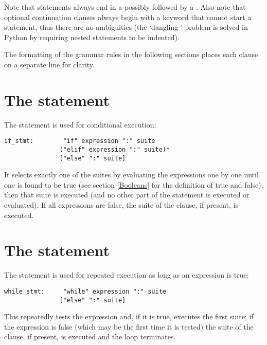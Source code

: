 Note that statements always end in a
 possibly followed by a
. Also note that optional
continuation clauses always begin with a keyword that cannot start a
statement, thus there are no ambiguities (the `dangling
' problem is solved in Python by requiring nested
 statements to be indented).

The formatting of the grammar rules in the following sections places
each clause on a separate line for clarity.

\section{The  statement}

The  statement is used for conditional execution:

\begin{verbatim}
if_stmt:        "if" expression ":" suite
               ("elif" expression ":" suite)*
               ["else" ":" suite]
\end{verbatim}

It selects exactly one of the suites by evaluating the expressions one
by one until one is found to be true (see section \ref{Booleans} for
the definition of true and false); then that suite is executed (and no
other part of the  statement is executed or evaluated).  If
all expressions are false, the suite of the  clause, if
present, is executed.

\section{The  statement}

The  statement is used for repeated execution as long
as an expression is true:

\begin{verbatim}
while_stmt:     "while" expression ":" suite
               ["else" ":" suite]
\end{verbatim}

This repeatedly tests the expression and, if it is true, executes the
first suite; if the expression is false (which may be the first time it
is tested) the suite of the  clause, if present, is
executed and the loop terminates.

